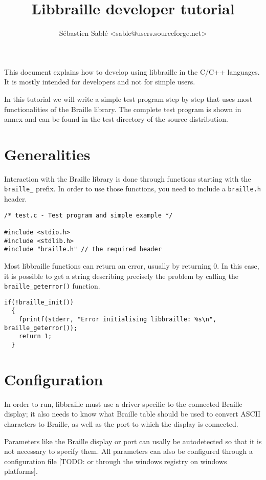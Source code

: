 \documentclass[12pt,a4paper]{article}
\author{S\'ebastien Sabl\'e <sable@users.sourceforge.net>}
\title{Libbraille developer tutorial}
\begin{document}
\maketitle
\tableofcontents

This document explains how to develop using libbraille in the
C/C++ languages. It is mostly intended for developers and not for
simple users.

In this tutorial we will write a simple test program step by step that
uses most functionalities of the Braille library. The complete test
program is shown in annex and can be found in the test directory of
the source distribution.

\section{Generalities}

Interaction with the Braille library is done through functions
starting with the {\tt braille\_} prefix. In order to use those
functions, you need to include a {\tt braille.h} header.

\begin{verbatim}
/* test.c - Test program and simple example */

#include <stdio.h>
#include <stdlib.h>
#include "braille.h" // the required header
\end{verbatim}   

Most libbraille functions can return an error, usually by returning
0. In this case, it is possible to get a string describing precisely
the problem by calling the {\tt braille\_geterror()} function.

\begin{verbatim}
if(!braille_init())
  {
    fprintf(stderr, "Error initialising libbraille: %s\n", braille_geterror());
    return 1;
  }
\end{verbatim}   

\section{Configuration}

In order to run, libbraille must use a driver specific to the
connected Braille display; it also needs to know what Braille table
should be used to convert ASCII characters to Braille, as well as the
port to which the display is connected.

Parameters like the Braille display or port can usally be autodetected
so that it is not necessary to specify them. All parameters can also
be configured through a configuration file [TODO: or through the
windows registry on windows platforms].
\end{document}
